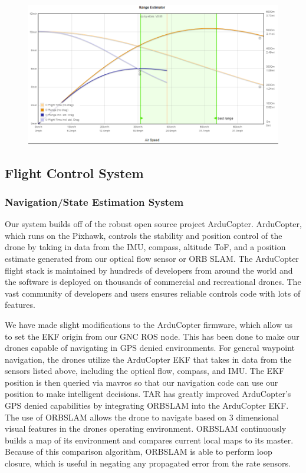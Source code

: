 \documentclass[12pt,letterpaper]{article}
\begin{document}
		\begin{figure}[!htbp]
			\begin{center}
				\includegraphics[width=\textwidth]{powerGraph}
			\end{center}
		\end{figure}

\pagebreak

	\subsection*{Flight Control System}
		\subsubsection*{Navigation/State Estimation System}

		Our system builds off of the robust open source project ArduCopter. ArduCopter, which runs on the Pixhawk, controls the stability and position control of the drone by taking in data from the IMU, compass, altitude ToF, and a position estimate generated from our optical flow sensor or ORB SLAM. The ArduCopter flight stack is maintained by hundreds of developers from around the world and the software is deployed on thousands of commercial and recreational drones. The vast community of developers and users ensures reliable controls code with lots of features.

		We have made slight modifications to the ArduCopter firmware, which allow us to set the EKF origin from our GNC ROS node. This has been done to make our drones capable of navigating in GPS denied environments. For general waypoint navigation, the drones utilize the ArduCopter EKF that takes in data from the sensors listed above, including the optical flow, compass, and IMU. The EKF position is then queried via mavros so that our navigation code can use our position to make intelligent decisions. TAR has greatly improved ArduCopter’s GPS denied capabilities by integrating ORBSLAM into the ArduCopter EKF. The use of ORBSLAM allows the drone to navigate based on 3 dimensional visual features in the drones operating environment. ORBSLAM continuously builds a map of its environment and compares current local maps to its master. Because of this comparison algorithm, ORBSLAM is able to perform loop closure, which is useful in negating any propagated error from the rate sensors.
\end{document}
